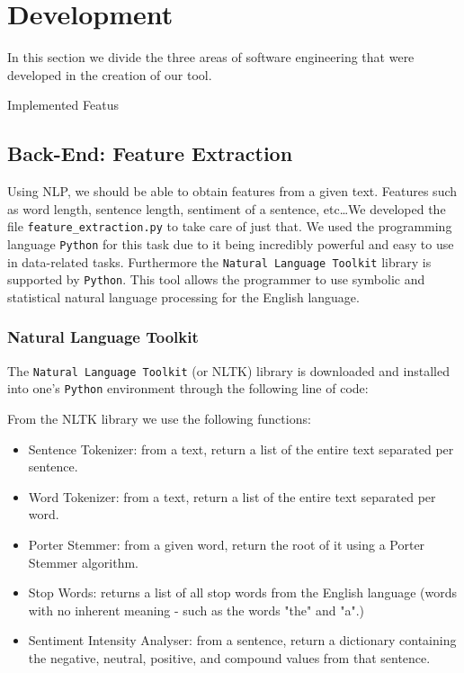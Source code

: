 \documentclass[runningheads]{llncs}
\begin{document}
\section{Development}
In this section we divide the three areas of software engineering that were developed in the creation of our tool. 

Implemented Featus


\subsection{Back-End: Feature Extraction}

Using NLP, we should be able to obtain features from a given text. Features such as word length, sentence length, sentiment of a sentence, etc\ldots We developed the file \texttt{feature\_extraction.py} to take care of just that. We used the programming language \texttt{Python} for this task due to it being incredibly powerful and easy to use in data-related tasks. Furthermore the \texttt{Natural Language Toolkit} library is supported by \texttt{Python}. This tool allows the programmer to use symbolic and statistical natural language processing for the English language.

\subsubsection{Natural Language Toolkit}

The \texttt{Natural Language Toolkit} (or NLTK) library is downloaded and installed into one's \texttt{Python} environment through the following line of code:


From the NLTK library we use the following functions:
\begin{itemize}
    \item Sentence Tokenizer: from a text, return a list of the entire text separated per sentence.
    \item Word Tokenizer: from a text, return a list of the entire text separated per word.
    \item Porter Stemmer: from a given word, return the root of it using a Porter Stemmer algorithm.
    \item Stop Words: returns a list of all stop words from the English language (words with no inherent meaning - such as the words "the" and "a".)
    \item Sentiment Intensity Analyser: from a sentence, return a dictionary containing the negative, neutral, positive, and compound values from that sentence.
\end{itemize}
\end{document}
